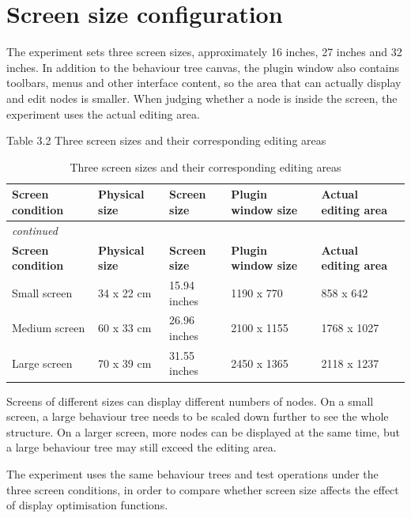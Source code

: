 \section{Screen size configuration}

The experiment sets three screen sizes, approximately 16 inches, 27 inches and 32 inches. In addition to the behaviour tree canvas, the plugin window also contains toolbars, menus and other interface content, so the area that can actually display and edit nodes is smaller. When judging whether a node is inside the screen, the experiment uses the actual editing area.

Table 3.2 Three screen sizes and their corresponding editing areas

\begin{center}

\begin{longtable}{@{}p{} p{} p{} p{} p{}@{}}
\caption{Three screen sizes and their corresponding editing areas}\label{tab:screen-configs}\\
\toprule
\textbf{Screen condition} & \textbf{Physical size} & \textbf{Screen size} & \textbf{Plugin window size} & \textbf{Actual editing area} \\
\midrule
\endfirsthead
\multicolumn{5}{l}{\itshape continued}\\
\toprule
\textbf{Screen condition} & \textbf{Physical size} & \textbf{Screen size} & \textbf{Plugin window size} & \textbf{Actual editing area} \\
\midrule
\endhead
Small screen & 34 x 22 cm & 15.94 inches & 1190 x 770 & 858 x 642 \\
Medium screen & 60 x 33 cm & 26.96 inches & 2100 x 1155 & 1768 x 1027 \\
Large screen & 70 x 39 cm & 31.55 inches & 2450 x 1365 & 2118 x 1237 \\
\bottomrule
\end{longtable}
\end{center}

Screens of different sizes can display different numbers of nodes. On a small screen, a large behaviour tree needs to be scaled down further to see the whole structure. On a larger screen, more nodes can be displayed at the same time, but a large behaviour tree may still exceed the editing area.

The experiment uses the same behaviour trees and test operations under the three screen conditions, in order to compare whether screen size affects the effect of display optimisation functions.

